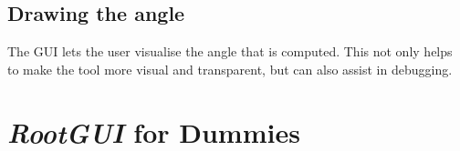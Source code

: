 \subsection{Drawing the angle}
The GUI lets the user visualise the angle that is computed. This not only helps to make the tool more visual and transparent, but can also assist in debugging. 



%


\section{\textit{RootGUI} for Dummies}


